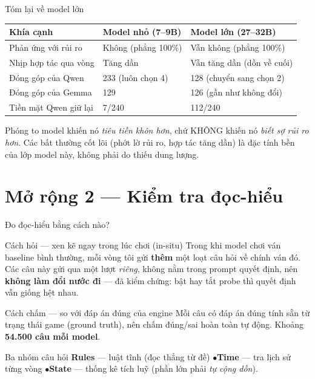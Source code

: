 \documentclass[aspectratio=169,11pt]{beamer}
\newcommand{\take}[1]{\vfill{\footnotesize\color{deepteal}#1}}
\begin{document}
\begin{frame}{Tóm lại về model lớn}
  \begin{center}\small
  \begin{tabular}{lll}
    \toprule
    Khía cạnh & Model nhỏ (7--9B) & Model lớn (27--32B) \\
    \midrule
    Phản ứng với rủi ro    & Không (phẳng 100\%) & \alert{Vẫn không} (phẳng 100\%) \\
    Nhịp hợp tác qua vòng  & Tăng dần & \alert{Vẫn tăng dần} (dồn về cuối) \\
    Đóng góp của Qwen      & 233 (luôn chọn 4) & \alert{128} (chuyển sang chọn 2) \\
    Đóng góp của Gemma     & 129 & 126 (gần như không đổi) \\
    Tiền mặt Qwen giữ lại  & 7/240 & \alert{112/240} \\
    \bottomrule
  \end{tabular}
  \end{center}
  \take{Phóng to model khiến nó \emph{tiêu tiền khôn hơn}, chứ KHÔNG khiến nó \emph{biết sợ rủi ro hơn}. Các bất thường cốt lõi (phớt lờ rủi ro, hợp tác tăng dần) là đặc tính bền của lớp model này, không phải do thiếu dung lượng.}
\end{frame}

\section{Mở rộng 2 --- Kiểm tra đọc-hiểu}

\begin{frame}{Đo đọc-hiểu bằng cách nào?}
  \begin{block}{Cách hỏi --- xen kẽ ngay trong lúc chơi (in-situ)}
    {\footnotesize Trong khi model chơi ván baseline bình thường, mỗi vòng tôi gửi \textbf{thêm} một loạt câu hỏi về chính ván đó. Các câu này gửi qua một lượt \emph{riêng}, không nằm trong prompt quyết định, nên \textbf{không làm đổi nước đi} --- đã kiểm chứng: bật hay tắt probe thì quyết định vẫn giống hệt nhau.}
  \end{block}
  \begin{block}{Cách chấm --- so với đáp án đúng của engine}
    {\footnotesize Mỗi câu có đáp án đúng tính sẵn từ trạng thái game (ground truth), nên chấm đúng/sai hoàn toàn tự động. Khoảng \textbf{54.500 câu mỗi model}.}
  \end{block}
  \begin{exampleblock}{Ba nhóm câu hỏi}
    {\footnotesize \textbf{Rules} --- luật tĩnh (đọc thẳng từ đề) \quad$\bullet$\quad \textbf{Time} --- tra lịch sử từng vòng \quad$\bullet$\quad \textbf{State} --- thống kê tích luỹ (phần lớn phải \emph{tự cộng dồn}).}
  \end{exampleblock}
\end{frame}
\end{document}
